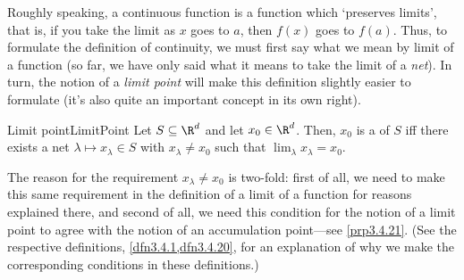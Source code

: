 Roughly speaking, a continuous function is a function which `preserves limits', that is, if you take the limit as $x$ goes to $a$, then $f(x)$ goes to $f(a)$.  Thus, to formulate the definition of continuity, we must first say what we mean by limit of a function (so far, we have only said what it means to take the limit of a \emph{net}).  In turn, the notion of a \emph{limit point} will make this definition slightly easier to formulate (it's also quite an important concept in its own right).
\begin{dfn}{Limit point}{LimitPoint}
Let $S\subseteq \R ^d$ and let $x_0\in \R ^d$.  Then, $x_0$ is a  of $S$ iff there exists a net $\lambda \mapsto x_\lambda \in S$ with $x_\lambda \neq x_0$ such that $\lim _\lambda x_\lambda =x_0$.
\begin{rmk}
The reason for the requirement $x_\lambda \neq x_0$ is two-fold:  first of all, we need to make this same requirement in the definition of a limit of a function for reasons explained there, and second of all, we need this condition for the notion of a limit point to agree with the notion of an accumulation point---see \cref{prp3.4.21}.  (See the respective definitions, \cref{dfn3.4.1,dfn3.4.20}, for an explanation of why we make the corresponding conditions in these definitions.)
\end{rmk}
\end{dfn}
